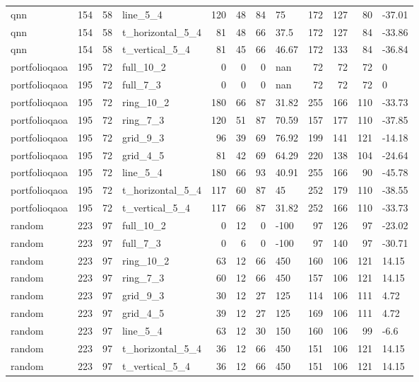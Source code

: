 \begin{longtable}{lrrlrrrlrrrl}
qnn & 154 & 58 & line\_5\_4 & 120 & 48 & 84 & 75 & 172 & 127 & 80 & -37.01 \\
qnn & 154 & 58 & t\_horizontal\_5\_4 & 81 & 48 & 66 & 37.5 & 172 & 127 & 84 & -33.86 \\
qnn & 154 & 58 & t\_vertical\_5\_4 & 81 & 45 & 66 & 46.67 & 172 & 133 & 84 & -36.84 \\
portfolioqaoa & 195 & 72 & full\_10\_2 & 0 & 0 & 0 & nan & 72 & 72 & 72 & 0 \\
portfolioqaoa & 195 & 72 & full\_7\_3 & 0 & 0 & 0 & nan & 72 & 72 & 72 & 0 \\
portfolioqaoa & 195 & 72 & ring\_10\_2 & 180 & 66 & 87 & 31.82 & 255 & 166 & 110 & -33.73 \\
portfolioqaoa & 195 & 72 & ring\_7\_3 & 120 & 51 & 87 & 70.59 & 157 & 177 & 110 & -37.85 \\
portfolioqaoa & 195 & 72 & grid\_9\_3 & 96 & 39 & 69 & 76.92 & 199 & 141 & 121 & -14.18 \\
portfolioqaoa & 195 & 72 & grid\_4\_5 & 81 & 42 & 69 & 64.29 & 220 & 138 & 104 & -24.64 \\
portfolioqaoa & 195 & 72 & line\_5\_4 & 180 & 66 & 93 & 40.91 & 255 & 166 & 90 & -45.78 \\
portfolioqaoa & 195 & 72 & t\_horizontal\_5\_4 & 117 & 60 & 87 & 45 & 252 & 179 & 110 & -38.55 \\
portfolioqaoa & 195 & 72 & t\_vertical\_5\_4 & 117 & 66 & 87 & 31.82 & 252 & 166 & 110 & -33.73 \\
random & 223 & 97 & full\_10\_2 & 0 & 12 & 0 & -100 & 97 & 126 & 97 & -23.02 \\
random & 223 & 97 & full\_7\_3 & 0 & 6 & 0 & -100 & 97 & 140 & 97 & -30.71 \\
random & 223 & 97 & ring\_10\_2 & 63 & 12 & 66 & 450 & 160 & 106 & 121 & 14.15 \\
random & 223 & 97 & ring\_7\_3 & 60 & 12 & 66 & 450 & 157 & 106 & 121 & 14.15 \\
random & 223 & 97 & grid\_9\_3 & 30 & 12 & 27 & 125 & 114 & 106 & 111 & 4.72 \\
random & 223 & 97 & grid\_4\_5 & 39 & 12 & 27 & 125 & 169 & 106 & 111 & 4.72 \\
random & 223 & 97 & line\_5\_4 & 63 & 12 & 30 & 150 & 160 & 106 & 99 & -6.6 \\
random & 223 & 97 & t\_horizontal\_5\_4 & 36 & 12 & 66 & 450 & 151 & 106 & 121 & 14.15 \\
random & 223 & 97 & t\_vertical\_5\_4 & 36 & 12 & 66 & 450 & 151 & 106 & 121 & 14.15 \\

\end{longtable}
